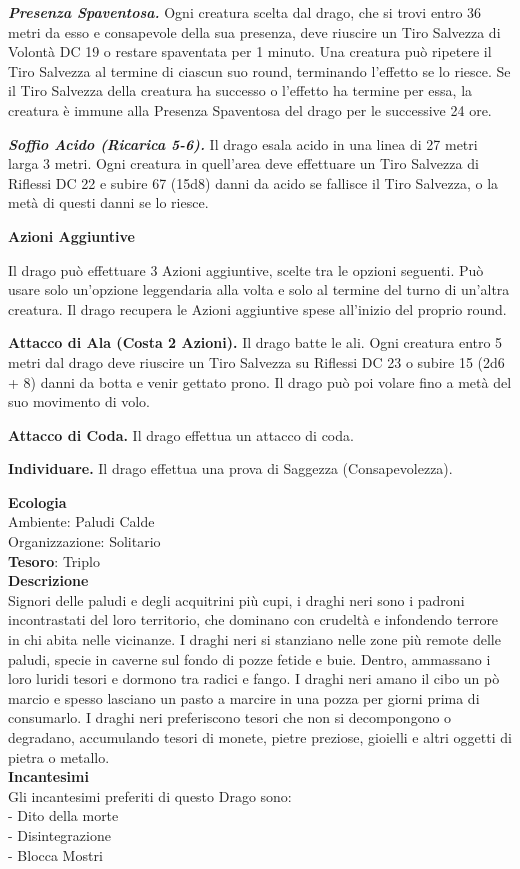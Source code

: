 \begin{multicols}{2}
	\textit{\textbf{Presenza Spaventosa.}} Ogni creatura scelta dal drago, che si trovi entro 36 metri da esso e consapevole della sua presenza, deve riuscire un Tiro Salvezza di Volontà DC 19 o restare spaventata per 1 minuto. Una creatura può ripetere il Tiro Salvezza al termine di ciascun suo round, terminando l'effetto se lo riesce. Se il Tiro Salvezza della creatura ha successo o l'effetto ha termine per essa, la creatura è immune alla Presenza Spaventosa del drago per le successive 24 ore.

	\textit{\textbf{Soffio Acido (Ricarica 5-6).}} Il drago esala acido in una linea di 27 metri larga 3 metri. Ogni creatura in quell'area deve effettuare un Tiro Salvezza di Riflessi DC 22 e subire 67 (15d8) danni da acido se fallisce il Tiro Salvezza, o la metà di questi danni se lo riesce.

	\textbf{Azioni Aggiuntive}

	Il drago può effettuare 3 Azioni aggiuntive, scelte tra le opzioni seguenti. Può usare solo un'opzione leggendaria alla volta e solo al termine del turno di un'altra creatura. Il drago recupera le Azioni aggiuntive spese all'inizio del proprio round.

	\textbf{Attacco di Ala (Costa 2 Azioni).} Il drago batte le ali. Ogni creatura entro 5 metri dal drago deve riuscire un Tiro Salvezza su Riflessi DC 23 o subire 15 (2d6 + 8) danni da botta e venir gettato prono. Il drago può poi volare fino a metà del suo movimento di volo.

	\textbf{Attacco di Coda.} Il drago effettua un attacco di coda.

	\textbf{Individuare.} Il drago effettua una prova di Saggezza (Consapevolezza).

	\textbf{Ecologia}\\
	Ambiente: Paludi Calde\\
	Organizzazione: Solitario\\
	\textbf{Tesoro}: Triplo\\
	\textbf{Descrizione}\\
	Signori delle paludi e degli acquitrini più cupi, i draghi neri sono i padroni incontrastati del loro territorio, che dominano con crudeltà e infondendo terrore in chi abita nelle vicinanze. I draghi neri si stanziano nelle zone più remote delle paludi, specie in caverne sul fondo di pozze fetide e buie. Dentro, ammassano i loro luridi tesori e dormono tra radici e fango. I draghi neri amano il cibo un pò marcio e spesso lasciano un pasto a marcire in una pozza per giorni prima di consumarlo. I draghi neri preferiscono tesori che non si decompongono o degradano, accumulando tesori di monete, pietre preziose, gioielli e altri oggetti di pietra o metallo.\\
	\textbf{Incantesimi}\\
	Gli incantesimi preferiti di questo Drago sono:\\
	- Dito della morte\\
	- Disintegrazione\\
	- Blocca Mostri



\end{multicols}
